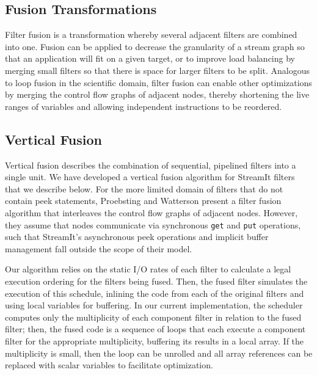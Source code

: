 \subsection{Fusion Transformations}

Filter fusion is a transformation whereby several adjacent filters are
combined into one.  Fusion can be applied to decrease the granularity
of a stream graph so that an application will fit on a given target,
or to improve load balancing by merging small filters so that there is
space for larger filters to be split.  Analogous to loop fusion in the
scientific domain, filter fusion can enable other optimizations by
merging the control flow graphs of adjacent nodes, thereby shortening
the live ranges of variables and allowing independent instructions to
be reordered.

\subsection{Vertical Fusion}

Vertical fusion describes the combination of sequential, pipelined
filters into a single unit.  We have developed a vertical fusion
algorithm for StreamIt filters that we describe below.  For the more
limited domain of filters that do not contain peek statements,
Proebsting and Watterson \cite{pro96} present a filter fusion
algorithm that interleaves the control flow graphs of adjacent nodes.
However, they assume that nodes communicate via synchronous {\tt get}
and {\tt put} operations, such that StreamIt's asynchronous peek
operations and implicit buffer management fall outside the scope of
their model.

Our algorithm relies on the static I/O rates of each filter to
calculate a legal execution ordering for the filters being fused.
Then, the fused filter simulates the execution of this schedule,
inlining the code from each of the original filters and using local
variables for buffering.  In our current implementation, the scheduler
computes only the multiplicity of each component filter in relation to
the fused filter; then, the fused code is a sequence of loops that
each execute a component filter for the appropriate multiplicity,
buffering its results in a local array.  If the multiplicity is small,
then the loop can be unrolled and all array references can be replaced
with scalar variables to facilitate optimization.

